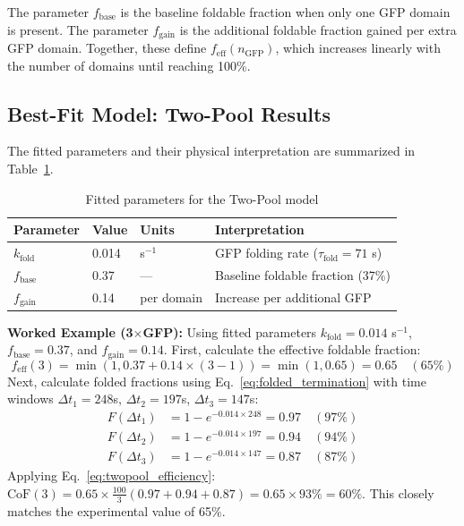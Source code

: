 \documentclass[11pt,a4paper]{article}
\newcommand{\kfold}{k_{\text{fold}}}
\newcommand{\taufold}{\tau_{\text{fold}}}
\begin{document}
The parameter $f_{\text{base}}$ is the baseline foldable fraction when only one GFP domain is present. The parameter $f_{\text{gain}}$ is the additional foldable fraction gained per extra GFP domain. Together, these define $f_{\text{eff}}(n_{\text{GFP}})$, which increases linearly with the number of domains until reaching 100\%.

\subsection{Best-Fit Model: Two-Pool Results}

The fitted parameters and their physical interpretation are summarized in Table~\ref{tab:twopool_params}.

\begin{table}[H]
\centering
\caption{Fitted parameters for the Two-Pool model}
\label{tab:twopool_params}
\begin{tabular}{@{}llll@{}}
\toprule
\textbf{Parameter} & \textbf{Value} & \textbf{Units} & \textbf{Interpretation} \\
\midrule
$\kfold$ & 0.014 & s$^{-1}$ & GFP folding rate ($\taufold = 71$ s) \\
$f_{\text{base}}$ & 0.37 & --- & Baseline foldable fraction (37\%) \\
$f_{\text{gain}}$ & 0.14 & per domain & Increase per additional GFP \\
\bottomrule
\end{tabular}
\end{table}

\begin{tcolorbox}[colback=gray!10, colframe=gray!50, arc=2mm, boxrule=0.5pt]
\textbf{Worked Example (3$\times$GFP):} Using fitted parameters $\kfold = 0.014$ s$^{-1}$, $f_{\text{base}} = 0.37$, and $f_{\text{gain}} = 0.14$. First, calculate the effective foldable fraction:
\[
f_{\text{eff}}(3) = \min(1, 0.37 + 0.14 \times (3-1)) = \min(1, 0.65) = 0.65 \quad (65\%)
\]
Next, calculate folded fractions using Eq.~\ref{eq:folded_termination} with time windows $\Delta t_1 = 248$s, $\Delta t_2 = 197$s, $\Delta t_3 = 147$s:
\begin{align*}
F(\Delta t_1) &= 1 - e^{-0.014 \times 248} = 0.97 \quad (97\%) \\
F(\Delta t_2) &= 1 - e^{-0.014 \times 197} = 0.94 \quad (94\%) \\
F(\Delta t_3) &= 1 - e^{-0.014 \times 147} = 0.87 \quad (87\%)
\end{align*}
Applying Eq.~\ref{eq:twopool_efficiency}: $\text{CoF}(3) = 0.65 \times \frac{100}{3}(0.97 + 0.94 + 0.87) = 0.65 \times 93\% = 60\%$. This closely matches the experimental value of 65\%.
\end{tcolorbox}
\end{document}
